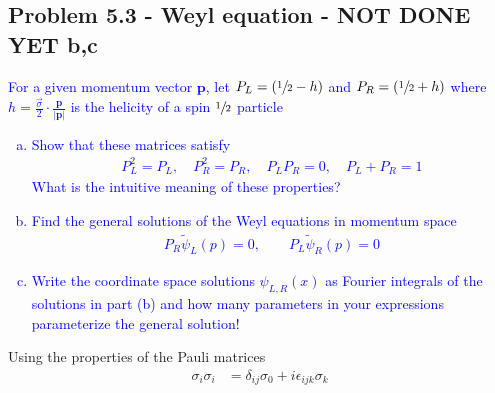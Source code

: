 \documentclass[../main.tex]{subfiles}
\begin{document}
\subsection{Problem 5.3 - Weyl equation - NOT DONE YET b,c}
\textcolor{blue}{For a given momentum vector $\mathbf{p}$, let $P_L=(\sfrac{1}{2}-h)$ and $P_R=(\sfrac{1}{2}+h)$ where $h=\frac{\vec{\sigma}}{2}\cdot\frac{\mathbf{p}}{|\mathbf{p}|}$ is the helicity of a spin $\sfrac{1}{2}$ particle
\begin{enumerate}[(a)]
\item Show that these matrices satisfy
\begin{align}
P_L^2=P_L,\quad 
P_R^2=P_R,\quad 
P_LP_R=0,\quad 
P_L+P_R=1
\end{align}
What is the intuitive meaning of these properties?
\item Find the general solutions of the Weyl equations in momentum space
\begin{align}
P_R\tilde{\psi}_L(p)=0,\qquad P_L\tilde{\psi}_R(p)=0
\end{align}
\item Write the coordinate space solutions $\psi_{L,R}(x)$ as Fourier integrals of the solutions in part (b) and how many parameters in your expressions parameterize the general solution!
\end{enumerate}}


Using the properties of the Pauli matrices
\begin{align}
\sigma_i\sigma_i&=\delta_{ij}\sigma_0+i\epsilon_{ijk}\sigma_k
\end{align}
\end{document}

